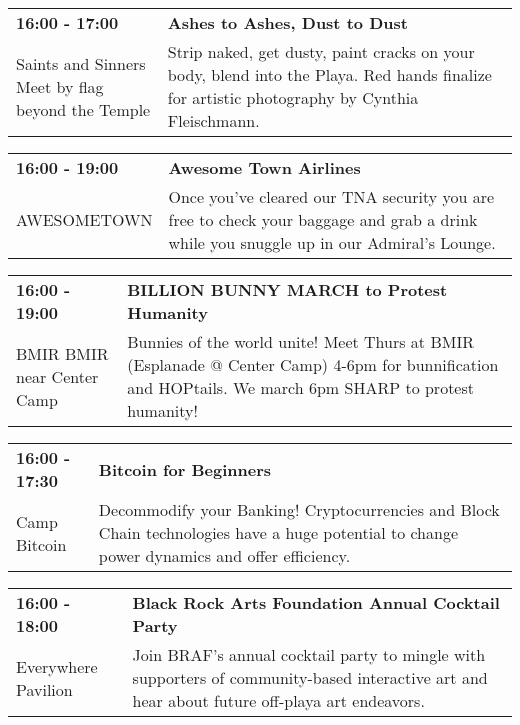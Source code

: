 \begin{tabular}{ p{1in} p{2.2in} }
    \textbf{16:00 - 17:00} & \textbf{Ashes to Ashes, Dust to Dust} \\
    Saints and Sinners \newline Meet by flag beyond the Temple & Strip naked, get dusty, paint cracks on your body, blend into the Playa. Red hands finalize for artistic photography by Cynthia Fleischmann. \\
    \hline 
\end{tabular}
    
\begin{tabular}{ p{1in} p{2.2in} }
    \textbf{16:00 - 19:00} & \textbf{Awesome Town Airlines} \\
    AWESOMETOWN \newline  & Once you've cleared our TNA security you are free to check your baggage and grab a drink while you snuggle up in our Admiral's Lounge. \\
    \hline 
\end{tabular}
    
\begin{tabular}{ p{1in} p{2.2in} }
    \textbf{16:00 - 19:00} & \textbf{BILLION BUNNY MARCH to Protest Humanity} \\
    BMIR \newline BMIR near Center Camp & Bunnies of the world unite! Meet Thurs at BMIR (Esplanade @ Center Camp) 4-6pm for bunnification and HOPtails. We march 6pm SHARP to protest humanity! \\
    \hline 
\end{tabular}
    
\begin{tabular}{ p{1in} p{2.2in} }
    \textbf{16:00 - 17:30} & \textbf{Bitcoin for Beginners} \\
    Camp Bitcoin \newline  & Decommodify your Banking! Cryptocurrencies and Block Chain technologies have a huge potential to change power dynamics and offer efficiency. \\
    \hline 
\end{tabular}
    
\begin{tabular}{ p{1in} p{2.2in} }
    \textbf{16:00 - 18:00} & \textbf{Black Rock Arts Foundation Annual Cocktail Party} \\
    Everywhere Pavilion \newline  & Join BRAF's annual cocktail party to mingle with supporters of community-based interactive art and hear about future off-playa art endeavors. \\
    \hline 
\end{tabular}
    
